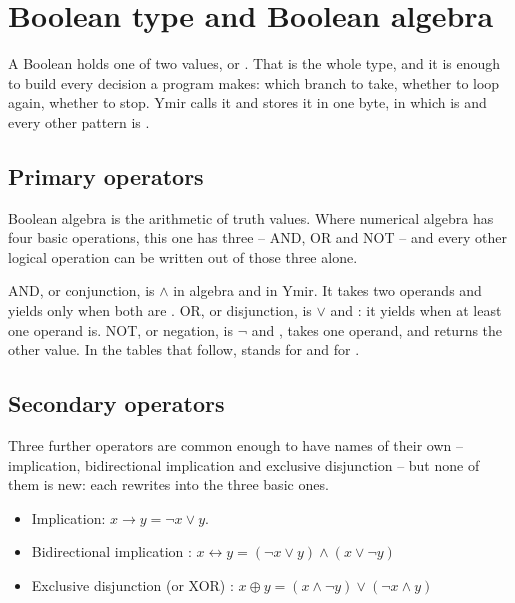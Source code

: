 \vfill\pagebreak
\section{Boolean type and Boolean algebra}
\label{sec:types:boolean}

A Boolean holds one of two values,  or . That is the
whole type, and it is enough to build every decision a program makes: which
branch to take, whether to loop again, whether to stop. Ymir calls it
 and stores it in one byte, in which  is
 and every other pattern is .

\subsection{Primary operators}

Boolean algebra is the arithmetic of truth values. Where numerical algebra has
four basic operations, this one has three -- AND, OR and NOT -- and every other
logical operation can be written out of those three alone.

AND, or conjunction, is $\land$ in algebra and \token{&&} in Ymir. It takes two
operands and yields  only when both are . OR, or
disjunction, is $\lor$ and \token{||}: it yields  when at least one
operand is. NOT, or negation, is $\lnot$ and \token{!}, takes one operand, and
returns the other value. In the tables that follow, \bot{} stands for
 and \top{} for .


\vspace{-10pt}%
\subsection{Secondary operators}

Three further operators are common enough to have names of their own --
implication, bidirectional implication and exclusive disjunction -- but none of
them is new: each rewrites into the three basic ones.

\begin{itemize}
\vspace{-5pt}%
\item Implication: $x \rightarrow y = \lnot x \lor y$.
\vspace{-5pt}%
\item Bidirectional implication : $x \leftrightarrow y = (\lnot x \lor y) \land (x \lor \lnot y)$ 
\vspace{-5pt}
\item Exclusive disjunction (or XOR) : $x \oplus y = (x \land \lnot y) \lor (\lnot x \land y)$
\end{itemize}
\vspace{-5pt}%

